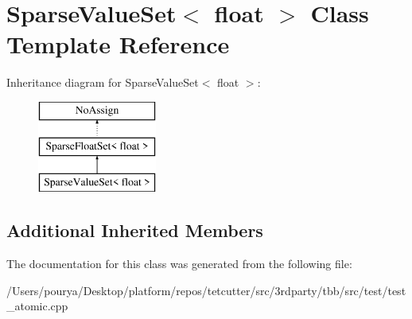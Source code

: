 \hypertarget{classSparseValueSet_3_01float_01_4}{}\section{Sparse\+Value\+Set$<$ float $>$ Class Template Reference}
\label{classSparseValueSet_3_01float_01_4}
Inheritance diagram for Sparse\+Value\+Set$<$ float $>$\+:\begin{figure}[H]
\begin{center}
\leavevmode
\includegraphics[height=3.000000cm]{classSparseValueSet_3_01float_01_4}
\end{center}
\end{figure}
\subsection*{Additional Inherited Members}


The documentation for this class was generated from the following file\+:\begin{DoxyCompactItemize}
\item 
/\+Users/pourya/\+Desktop/platform/repos/tetcutter/src/3rdparty/tbb/src/test/test\+\_\+atomic.\+cpp\end{DoxyCompactItemize}
